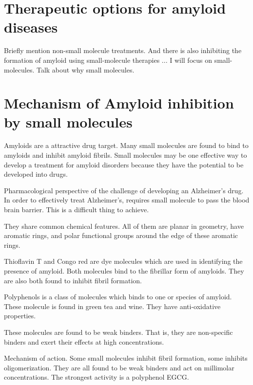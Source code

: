 \section{Therapeutic options for amyloid diseases}
\begin{outline}
  \1 Briefly mention non-small molecule treatments.
  \1 And there is also inhibiting the formation of amyloid using small-molecule therapies ... I will focus on small-molecules.  Talk about why small molecules. 
\end{outline} 


\section{Mechanism of Amyloid inhibition by small molecules}
  \begin{outline}[enumerate]
    \1 Amyloids are a attractive drug target.  Many small molecules are found to bind to amyloids and inhibit amyloid fibrils.   Small molecules may be one effective way to develop a treatment for amyloid disorders because they have the potential to be developed into drugs.
      
      \2 Pharmacological perspective of the challenge of developing an Alzheimer's drug. In order to effectively treat Alzheimer's, requires small molecule to pass the blood brain barrier.  This is a difficult thing to achieve.

      \2 They share common chemical features.  All of them are planar in geometry, have aromatic rings, and polar functional groups around the edge of these aromatic rings.

      \2 Thioflavin T and Congo red are dye molecules which are used in identifying the presence of amyloid.  Both molecules bind to the fibrillar form of amyloids. They are also both found to inhibit fibril formation.
      
      \2 Polyphenols is a class of molecules which binds to one or species of amyloid. These molecule is found in green tea and wine.  They have anti-oxidative properties.
      
    \1 These molecules are found to be weak binders.  That is, they are non-specific binders and exert their effects at high concentrations.
      
        \2 Mechanism of action. Some small molecules inhibit fibril formation, some inhibits oligomerization. They are all found to be weak binders and act on millimolar concentrations. The strongest activity is a polyphenol EGCG.
\end{outline}


